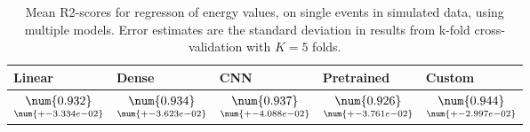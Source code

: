 \begin{table}
\centering
\caption{
Mean R2-scores for regresson of energy values, on single events in simulated data, using multiple models. 
Error estimates are the standard deviation in results from k-fold cross-validation 
with $K=5$ folds.
}
\label{tab:regression-simulated-single-energy-r2}
\begin{tabular}{lllll}
\toprule
                                             Linear &                                               Dense &                                                 CNN &                                          Pretrained &                                              Custom \\
\midrule
 $\underset{\num{+- 3.334e-02 }  }{\num{ 0.932 } }$ &  $\underset{\num{+- 3.623e-02 }  }{\num{ 0.934 } }$ &  $\underset{\num{+- 4.088e-02 }  }{\num{ 0.937 } }$ &  $\underset{\num{+- 3.761e-02 }  }{\num{ 0.926 } }$ &  $\underset{\num{+- 2.997e-02 }  }{\num{ 0.944 } }$ \\
\bottomrule
\end{tabular}
\end{table}
